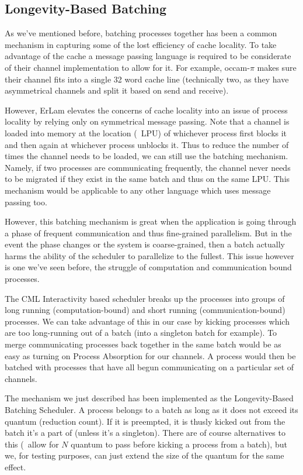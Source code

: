 \subsection{Longevity-Based Batching}\label{sec:longevity based batching}

As we've mentioned before, batching processes together has been a common 
mechanism in capturing some of the lost efficiency of cache locality. To take
advantage of the cache a message passing language is required to be considerate 
of their channel implementation to allow for it. For example, occam-$\pi$ makes sure
their channel fits into a single 32 word cache line (technically two, as they
have asymmetrical channels and split it based on send and receive).

However, ErLam elevates the concerns of cache locality into an issue of process 
locality by relying only on symmetrical message passing. Note that 
a channel is loaded into memory at the location (\ie~LPU) of whichever process 
first blocks it and then again at whichever process unblocks it. Thus to reduce
the number of times the channel needs to be loaded, we can still use the 
batching mechanism. Namely, if two processes are communicating frequently, the
channel never needs to be migrated if they exist in the same batch and thus on the
same LPU. This mechanism would be applicable to any other language which uses 
message passing too.

However, this batching mechanism is great when the application is going through
a phase of frequent communication and thus fine-grained parallelism. But in the
event the phase changes or the system is coarse-grained, then a batch actually
harms the ability of the scheduler to parallelize to the fullest. This issue 
however is one we've seen before, the struggle of computation and communication
bound processes.

The CML Interactivity based scheduler breaks up the processes into groups of
long running (computation-bound) and short running (communication-bound)
processes. We can take advantage of this in our case by kicking processes which
are too long-running out of a batch (into a singleton batch for example). To 
merge communicating processes back together in the same batch would be as easy
as turning on Process Absorption for our channels. A process would then be
batched with processes that have all begun communicating on a particular set
of channels.

The mechanism we just described has been implemented as the Longevity-Based
Batching Scheduler. A process belongs to a batch as long as it does not exceed
its quantum (reduction count). If it is preempted, it is thusly kicked out 
from the batch it's a part of (unless it's a singleton). There are of course
alternatives to this (\eg~allow for $N$ quantum to pass before kicking a 
process from a batch), but we, for testing purposes, can just extend the size
of the quantum for the same effect.

